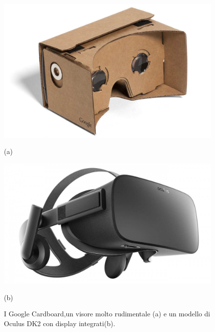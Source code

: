 \vspace{0.2cm}

\begin{figure}[H]
	\centering
	\begin{minipage}[b]{0.49\textwidth}
		\includegraphics[width=\textwidth]{figure/Cardboard}
		{\footnotesize \centerline{(a)} \par}
	\end{minipage}
	\hfill
	\begin{minipage}[b]{0.49\textwidth}
		\includegraphics[width=\textwidth]{figure/Oculus}
		{\footnotesize \centerline{(b)} \par}
	\end{minipage}
	\caption{I Google Cardboard,un visore molto rudimentale (a) e un modello di Oculus DK2 con display integrati(b).}
\end{figure}

\newpage

